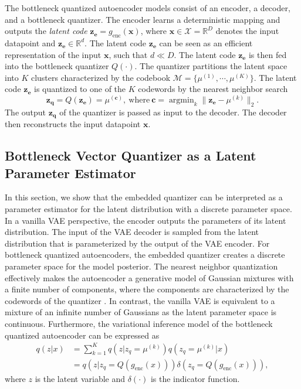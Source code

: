 \documentclass[letterpaper]{article} %
\DeclareMathOperator*{\argmin}{arg\min}
\begin{document}
 The bottleneck quantized autoencoder models consist of an encoder, a decoder, and a bottleneck quantizer. The encoder learns a deterministic mapping and outputs the \emph{latent code} $\mathbf{z_e} = g_{\text{enc}}(\mathbf{x})$, where $\mathbf{x} \in \mathcal{X} = \mathbb{R}^{D}$ denotes the input datapoint and $\mathbf{z_e} \in \mathbb{R}^{d}$. The latent code $\mathbf{z_e}$ can be seen as an efficient representation of the input $\mathbf{x}$, such that $d \ll D$. The latent code $\mathbf{z_e}$ is then fed into the bottleneck quantizer $Q(\cdot)$. The quantizer partitions the latent space into $K$ clusters characterized by the codebook $\mathcal{M}  = \{\mu^{(1)}, \cdots, \mu^{(K)}\}$. The latent code $\mathbf{z_e}$ is quantized to one of the $K$ codewords by the nearest neighbor search
 \begin{equation}
 \label{eq:assgn1}
 \mathbf{z_q} = Q(\mathbf{z_e}) = \mu^{(\mathbf{c})}, \ \text{where} \ \mathbf{c} = \argmin_k\|\mathbf{z_e}-\mu^{(k)}\|_2.
 \end{equation}
 The output $\mathbf{z_q}$ of the quantizer is passed as input to the decoder. The decoder then reconstructs the input datapoint $\mathbf{x}$.
\subsection{Bottleneck Vector Quantizer as a Latent Parameter Estimator}
In this section, we show that the embedded quantizer can be interpreted as a parameter estimator for the latent distribution with a discrete parameter space. In a vanilla VAE perspective, the encoder outputs the parameters of its latent distribution. The input of the VAE decoder is sampled from the latent distribution that is parameterized by the output of the VAE encoder. For bottleneck quantized autoencoders, the embedded quantizer creates a discrete parameter space for the model posterior. The nearest neighbor quantization effectively makes the autoencoder a generative model of Gaussian mixtures with a finite number of components, where the components are characterized by the codewords of the quantizer \cite{Henter2018}. In contrast, the vanilla VAE is equivalent to a mixture of an infinite number of Gaussians as the latent parameter space is continuous. Furthermore, the variational inference model of the bottleneck quantized autoencoder can be expressed as
	\begin{align}
	q(z|x) &= \sum_{k = 1}^Kq\left(z|z_q = \mu^{(k)}\right)q\left(z_q = \mu^{(k)}|x\right) \\
	&= q\left(z|z_q = Q(g_{\text{enc}}(x))\right)\delta\left(z_q = Q(g_{\text{enc}}(x))\right),
	\end{align}
	where $z$ is the latent variable and $\delta(\cdot)$ is the indicator function.
\end{document}
